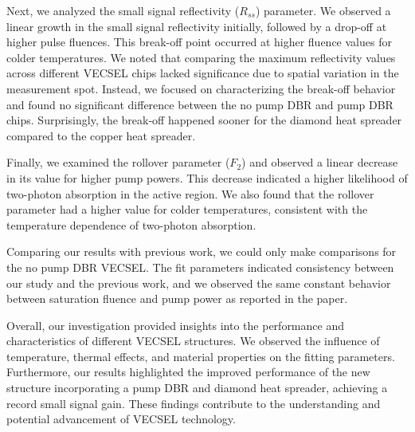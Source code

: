 Next, we analyzed the small signal reflectivity ($R_{ss}$) parameter. We observed a linear growth in the small signal reflectivity initially, followed by a drop-off at higher pulse fluences. This break-off point occurred at higher fluence values for colder temperatures. We noted that comparing the maximum reflectivity values across different VECSEL chips lacked significance due to spatial variation in the measurement spot. Instead, we focused on characterizing the break-off behavior and found no significant difference between the no pump DBR and pump DBR chips. Surprisingly, the break-off happened sooner for the diamond heat spreader compared to the copper heat spreader.

Finally, we examined the rollover parameter ($F_2$) and observed a linear decrease in its value for higher pump powers. This decrease indicated a higher likelihood of two-photon absorption in the active region. We also found that the rollover parameter had a higher value for colder temperatures, consistent with the temperature dependence of two-photon absorption.

Comparing our results with previous work, we could only make comparisons for the no pump DBR VECSEL. The fit parameters indicated consistency between our study and the previous work, and we observed the same constant behavior between saturation fluence and pump power as reported in the paper.

Overall, our investigation provided insights into the performance and characteristics of different VECSEL structures. We observed the influence of temperature, thermal effects, and material properties on the fitting parameters. Furthermore, our results highlighted the improved performance of the new structure incorporating a pump DBR and diamond heat spreader, achieving a record small signal gain. These findings contribute to the understanding and potential advancement of VECSEL technology.
